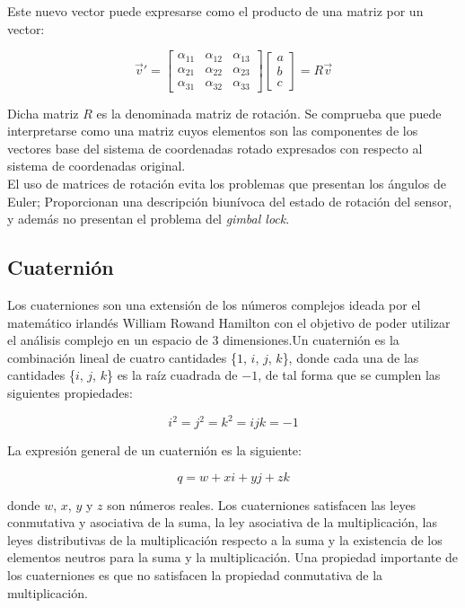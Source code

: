 \documentclass[12pt, a4paper]{report}
\begin{document}
Este nuevo vector puede expresarse como el producto de una matriz por un vector:

$$ \vec{v}' = \begin{bmatrix}  \alpha_{11} & \alpha_{12} & \alpha_{13} \\ \alpha_{21} & \alpha_{22} & \alpha_{23}\\ \alpha_{31} & \alpha_{32} & \alpha_{33} \end{bmatrix} \begin{bmatrix} a \\ b \\ c \end{bmatrix} = R \vec{v}$$

Dicha matriz $R$ es la denominada matriz de rotación. Se comprueba que puede interpretarse como una matriz cuyos elementos son las componentes de los vectores base del sistema de coordenadas rotado expresados con respecto al sistema de coordenadas original.\\

El uso de matrices de rotación evita los problemas que presentan los ángulos de Euler; Proporcionan una descripción biunívoca del estado de rotación del sensor, y además no presentan el problema del \textit{gimbal lock}. 

\subsection{Cuaternión}

Los cuaterniones son una extensión de los números complejos ideada por el matemático irlandés William Rowand Hamilton con el objetivo de poder utilizar el análisis complejo en un espacio de 3 dimensiones.Un cuaternión es la combinación lineal de cuatro cantidades \{$1$, $i$, $j$, $k$\}, donde cada una de las cantidades \{$i$, $j$, $k$\} es la raíz cuadrada de $-1$, de tal forma que se cumplen las siguientes propiedades:

$$ i^2 = j^2 = k^2 = ijk = -1 $$

La expresión general de un cuaternión es la siguiente:

\begin{equation} \label{eq: gen_quaternion}
q = w + xi + yj + zk
\end{equation}

donde $w$, $x$, $y$ y $z$ son números reales. Los cuaterniones satisfacen las leyes conmutativa y asociativa de la suma, la ley asociativa de la multiplicación, las leyes distributivas de la multiplicación respecto a la suma y la existencia de los elementos neutros para la suma y la multiplicación. Una propiedad importante de los cuaterniones es que no satisfacen la propiedad conmutativa de la multiplicación.
\end{document}

